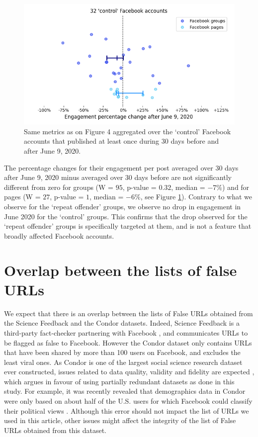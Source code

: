 \documentclass[review]{elsarticle}
\begin{document}
\begin{figure}[!h]
\centering
\includegraphics[scale=0.5]{./../figure/supplementary_mainstream_june_drop_percentage_change.png}
\caption{
Same metrics as on Figure 4 aggregated over the `control' Facebook accounts that published at least once during 30 days before and after June 9, 2020.
}
\label{june_drop_control}
\end{figure}

The percentage changes for their engagement per post averaged over 30 days after June 9, 2020 minus averaged over 30 days before are not significantly different from zero for groups (W = $95$, p-value = $0.32$, median = $-7\%$) and for pages (W = $27$, p-value = $1$, median = $-6\%$, see Figure \ref{june_drop_control}).
Contrary to what we observe for the `repeat offender' groups, we observe no drop in engagement in June 2020 for the `control' groups.
This confirms that the drop observed for the `repeat offender' groups is specifically targeted at them, and is not a feature that broadly affected Facebook accounts.

\section*{Overlap between the lists of false URLs}

We expect that there is an overlap between the lists of False URLs obtained from the Science Feedback and the Condor datasets. 
Indeed, Science Feedback is a third-party fact-checker partnering with Facebook \citep{sciencefeedbackFbPartner}, and communicates URLs to be flagged as false to Facebook.
However the Condor dataset only contains URLs that have been shared by more than 100 users on Facebook, and excludes the least viral ones.
As Condor is one of the largest social science research dataset ever constructed, issues related to data quality, validity and fidelity are expected \cite{messing2020facebook}, which argues in favour of using partially redundant datasets as done in this study.
For example, it was recently revealed that demographics data in Condor were only based on about half of the U.S. users for which Facebook could classify their political views \citep{NYTrevelations}. 
Although this error should not impact the list of URLs we used in this article, other issues might affect the integrity of the list of False URLs obtained from this dataset.
\end{document}
